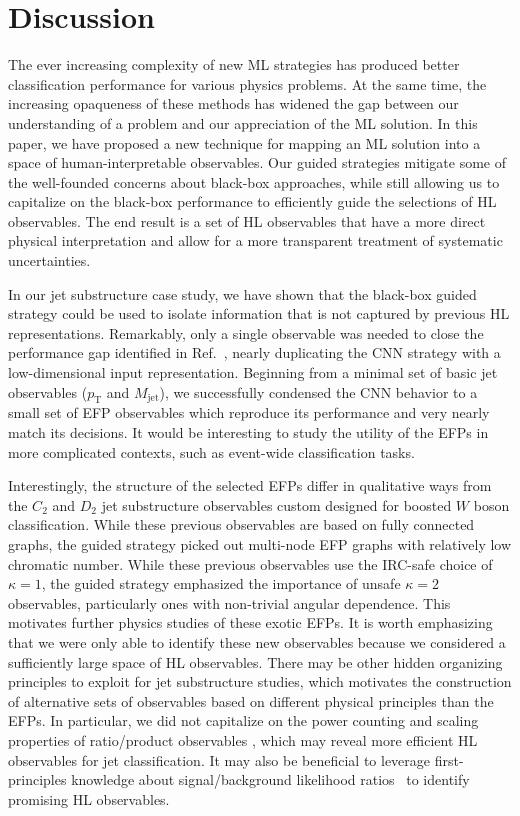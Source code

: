 \documentclass[aps,prd,twocolumn,superscriptaddress,preprintnumbers,nofootinbib,longbibliography,floatfix]{revtex4-1}
\newcommand{\rref}[1]{Ref.~\cite{#1}}
\begin{document}
\section{Discussion}
\label{sec:discussion}
The ever increasing complexity of new ML strategies has produced better classification performance for various physics problems. At the same time, the increasing opaqueness of these methods has widened the gap between our understanding of a problem and our appreciation of the ML solution. In this paper, we have proposed a new technique for mapping an ML solution into a space of human-interpretable observables. Our guided strategies mitigate some of the well-founded concerns about black-box approaches, while still allowing us to capitalize on the black-box performance to efficiently guide the selections of HL observables. The end result is a set of HL observables that have a more direct physical interpretation and allow for a more transparent treatment of systematic uncertainties.

In our jet substructure case study, we have shown that the black-box guided strategy could be used to isolate information that is not captured by previous HL representations. Remarkably, only a single observable was needed to close the performance gap identified in \rref{Baldi:2016fql}, nearly duplicating the CNN strategy with a low-dimensional input representation. Beginning from a minimal set of basic jet observables ($p_\textrm{T}$ and $M_{\textrm{jet}}$), we successfully condensed the CNN behavior to a small set of EFP observables which reproduce its performance and very nearly match its decisions.  It would be interesting to study the utility of the EFPs in more complicated contexts, such as event-wide classification tasks.

Interestingly, the structure of the selected EFPs differ in qualitative ways from the $C_2$ and $D_2$ jet substructure observables custom designed for boosted $W$ boson classification. While these previous observables are based on fully connected graphs, the guided strategy picked out multi-node EFP graphs with relatively low chromatic number. While these previous observables use the IRC-safe choice of $\kappa = 1$, the guided strategy emphasized the importance of unsafe $\kappa = 2$ observables, particularly ones with non-trivial angular dependence. This motivates further physics studies of these exotic EFPs. It is worth emphasizing that we were only able to identify these new observables because we considered a sufficiently large space of HL observables. There may be other hidden organizing principles to exploit for jet substructure studies, which motivates the construction of alternative sets of observables based on different physical principles than the EFPs. In particular, we did not capitalize on the power counting and scaling properties of ratio/product observables \cite{Larkoski:2014gra,Moult:2016cvt,Datta:2017lxt,Datta:2019ndh,Sirunyan:2020lcu}, which may reveal more efficient HL observables for jet classification. It may also be beneficial to leverage first-principles knowledge about signal/background likelihood ratios~\cite{Soper:2011cr,Soper:2012pb,Soper:2014rya,FerreiradeLima:2016gcz,Larkoski:2019nwj,Buckley:2020kdp,Kasieczka:2020nyd} to identify promising HL observables. 
\end{document}
